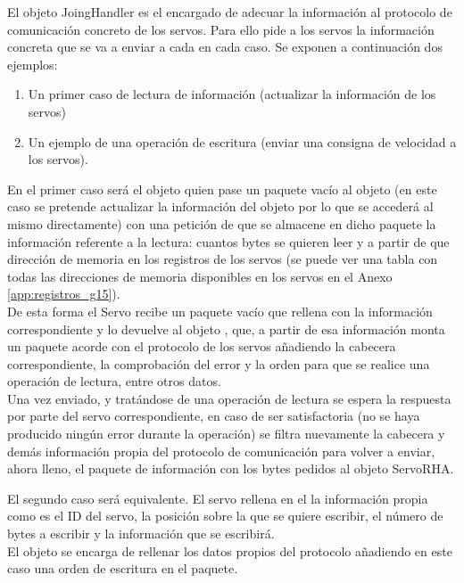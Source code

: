 	El objeto JoingHandler es el encargado de adecuar la información al protocolo de comunicación concreto de los servos. Para ello pide a los servos la información concreta que se va a enviar a cada en cada caso. Se exponen a continuación dos ejemplos:
	\begin{enumerate}
		\item Un primer caso de lectura de información (actualizar la información de los servos)
		\item Un ejemplo de una operación de escritura (enviar una consigna de velocidad a los servos).
	\end{enumerate} 
	
	En el primer caso será el objeto  quien pase un paquete vacío al objeto  (en este caso se pretende actualizar la información del objeto  por lo que se accederá al mismo directamente) con una petición de que se almacene en dicho paquete la información referente a la lectura: cuantos bytes se quieren leer y a partir de que dirección de memoria en los registros de los servos (se puede ver una tabla con todas las direcciones de memoria disponibles en los servos en el Anexo \ref{app:registros_g15}).
	\\ 
	
	De esta forma el Servo recibe un paquete vacío que rellena con la información correspondiente y lo devuelve al objeto , que, a partir de esa información monta un paquete acorde con el protocolo de los servos añadiendo la cabecera correspondiente, la comprobación del error y la orden para que se realice una operación de lectura, entre otros datos.
	\\ 
	
	Una vez enviado, y tratándose de una operación de lectura se espera la respuesta por parte del servo correspondiente, en caso de ser satisfactoria (no se haya producido ningún error durante la operación) se filtra nuevamente la cabecera y demás información propia del protocolo de comunicación para volver a enviar, ahora lleno, el paquete de información con los bytes pedidos al objeto ServoRHA.
	
	
	El segundo caso será equivalente. El servo rellena en el  la información propia como es el ID del servo, la posición sobre la que se quiere escribir, el número de bytes a escribir y la información que se escribirá.
	\\ 
	El objeto  se encarga de rellenar los datos propios del protocolo añadiendo en este caso una orden de escritura en el paquete.
	\\ 
	

